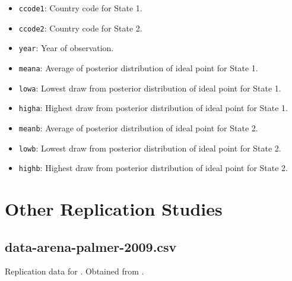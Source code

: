 \documentclass[12pt]{article}
\begin{document}
\begin{itemize}
  \item \texttt{ccode1}: Country code for State 1.
  \item \texttt{ccode2}: Country code for State 2.
  \item \texttt{year}: Year of observation.
  \item \texttt{meana}: Average of posterior distribution of ideal point for State 1.
  \item \texttt{lowa}: Lowest draw from posterior distribution of ideal point for State 1.
  \item \texttt{higha}: Highest draw from posterior distribution of ideal point for State 1.
  \item \texttt{meanb}: Average of posterior distribution of ideal point for State 2.
  \item \texttt{lowb}: Lowest draw from posterior distribution of ideal point for State 2.
  \item \texttt{highb}: Highest draw from posterior distribution of ideal point for State 2.
\end{itemize}



\section{Other Replication Studies}




\subsection{data-arena-palmer-2009.csv}

Replication data for \citet{Arena:2009gk}.
Obtained from \citet{arena2009data}.
\end{document}
